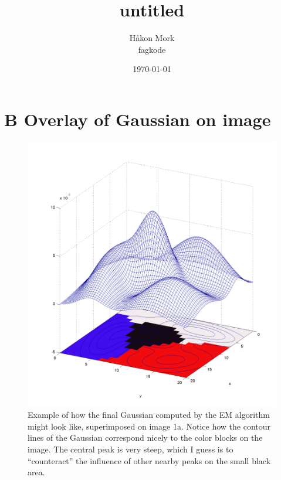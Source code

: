 \documentclass[letterpaper, 10pt]{article}
\title{\textbf{untitled}}
\author{Håkon Mork \\ fagkode}
\date{\today}
\numberwithin{theorem}{section}
\begin{document}
\section*{B \quad Overlay of Gaussian on image}
\setcounter{page}{6}
\setcounter{figure}{15}
\begin{figure}[h!]
	\centering
	\includegraphics[width=\textwidth]{1a-gaussian}
	\caption{Example of how the final Gaussian computed by the EM algorithm might look like, superimposed on image 1a. Notice how the contour lines of the Gaussian correspond nicely to the color blocks on the image. The central peak is very steep, which I guess is to ``counteract'' the influence of other nearby peaks on the small black area.}
	\label{fig:1a-gaussian}
\end{figure}
\end{document}
